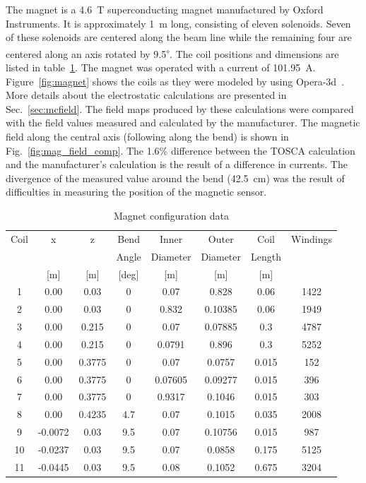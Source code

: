 \documentclass[oneside,12pt]{memoir}
\begin{document}
The magnet is a 4.6~T superconducting magnet manufactured by Oxford Instruments. It is approximately 1~m long, consisting of eleven solenoids. Seven of these solenoids are centered along the beam line while the remaining four are centered along an axis rotated by 9.5\textsuperscript{$\circ$}. The coil positions and dimensions are listed in table~\ref{tab:magnet}. The magnet was operated with a current of 101.95~A. Figure~\ref{fig:magnet} shows the coils as they were modeled by using Opera-3d~\cite{opera3d}. More details about the electrostatic calculations are presented in Sec.~\ref{sec:mcfield}. The field maps produced by these calculations were compared with the field values measured and calculated by the manufacturer. The magnetic field along the central axis (following along the bend) is shown in Fig.~\ref{fig:mag_field_comp}. The 1.6\% difference between the TOSCA calculation and the manufacturer's calculation is the result of a difference in currents. The divergence of the measured value around the bend (42.5~cm) was the result of difficulties in measuring the position of the magnetic sensor.\par
\begin{table}
	\caption{Magnet configuration data}
	\label{tab:magnet}
	\begin{tabular}{|c|c|c|c|c|c|c|c|}
		\hline
		Coil & x & z & Bend & Inner & Outer & Coil & Windings \\
		& & & Angle & Diameter & Diameter & Length & \\
		& [m] & [m] & [deg] & [m] & [m] & [m] & \\ \hline
		1 & 0.00 & 0.03 & 0 & 0.07 & 0.828 & 0.06 & 1422 \\
		2 & 0.00 & 0.03 & 0 & 0.832 & 0.10385 & 0.06 & 1949 \\
		3 & 0.00 & 0.215 & 0 & 0.07 & 0.07885 & 0.3 & 4787 \\
		4 & 0.00 & 0.215 & 0 & 0.0791 & 0.896 & 0.3 & 5252 \\
		5 & 0.00 & 0.3775 & 0 & 0.07 & 0.0757 & 0.015 & 152 \\
		6 & 0.00 & 0.3775 & 0 & 0.07605 & 0.09277 & 0.015 & 396 \\
		7 & 0.00 & 0.3775 & 0 & 0.9317 & 0.1046 & 0.015 & 303 \\
		8 & 0.00 & 0.4235 & 4.7 & 0.07 & 0.1015 & 0.035 & 2008 \\
		9 & -0.0072 & 0.03 & 9.5 & 0.07 & 0.10756 & 0.015 & 987 \\
		10 & -0.0237 & 0.03 & 9.5 & 0.07 & 0.0858 & 0.175 & 5125 \\
		11 & -0.0445 & 0.03 & 9.5 & 0.08 & 0.1052 & 0.675 & 3204 \\ \hline
	\end{tabular}
\end{table}
\end{document}
